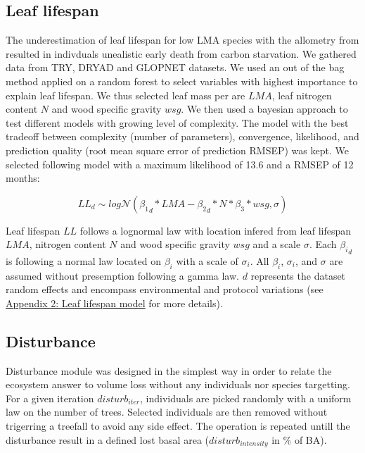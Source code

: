\documentclass[12pt,]{article}
\theoremstyle{definition}
\theoremstyle{definition}
\theoremstyle{remark}
\begin{document}
\subsection{Leaf lifespan}\label{leaf-lifespan}

The underestimation of leaf lifespan for low LMA species with the
allometry from \citet{Reich1991a} resulted in indivduals unealistic
early death from carbon starvation. We gathered data from
TRY\citep{Kattge2011}, DRYAD \citep{chave_towards_2009} and GLOPNET
\citep{wright_worldwide_2004} datasets. We used an out of the bag method
applied on a random forest to select variables with highest importance
to explain leaf lifespan. We thus selected leaf mass per are \(LMA\),
leaf nitrogen content \(N\) and wood specific gravity \(wsg\). We then
used a bayesian approach to test different models with growing level of
complexity. The model with the best tradeoff between complexity (number
of parameters), convergence, likelihood, and prediction quality (root
mean square error of prediction RMSEP) was kept. We selected following
model with a maximum likelihood of 13.6 and a RMSEP of 12 months:

\begin{equation}
  LL_{d} \sim log\mathcal{N}({\beta_1}_d*LMA - {\beta_2}_d*N*\beta_3*wsg, \sigma)
  \label{eq:LL}
\end{equation}

Leaf lifespan \(LL\) follows a lognormal law with location infered from
leaf lifespan \(LMA\), nitrogen content \(N\) and wood specific gravity
\(wsg\) and a scale \(\sigma\). Each \({\beta_i}_d\) is following a
normal law located on \(\beta_i\) with a scale of \(\sigma_i\). All
\(\beta_i\), \(\sigma_i\), and \(\sigma\) are assumed without
presemption following a gamma law. \(d\) represents the dataset random
effects and encompass environmental and protocol variations (see
\protect\hyperlink{appendix-2-leaf-lifespan-model}{Appendix 2: Leaf
lifespan model} for more details).

\subsection{Disturbance}\label{disturbance}

Disturbance module was designed in the simplest way in order to relate
the ecosystem answer to volume loss without any individuals nor species
targetting. For a given iteration \(disturb_{iter}\), individuals are
picked randomly with a uniform law on the number of trees. Selected
individuals are then removed without trigerring a treefall to avoid any
side effect. The operation is repeated untill the disturbance result in
a defined lost basal area (\(disturb_{intensity}\) in \% of BA).
\end{document}
